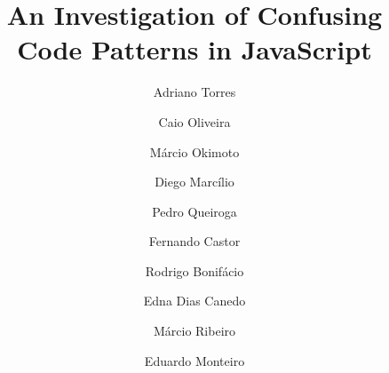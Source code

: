 \documentclass[preprint,12pt]{elsarticle}
\begin{document}
\begin{frontmatter}


\title{An Investigation of Confusing Code Patterns in JavaScript}

\author[1]{Adriano Torres}
\author[1]{Caio Oliveira}
\author[1]{M\'{a}rcio Okimoto}
\author[2]{Diego Marc\'{i}lio} 
\author[3]{Pedro Queiroga}
\author[4,5]{Fernando Castor}
\author[1]{Rodrigo Bonif\'{a}cio}
\author[1]{Edna Dias Canedo}
\author[5]{M\'{a}rcio Ribeiro}
\author[6]{Eduardo Monteiro}

\address[1]{Computer Science Department, University of Bras\'{i}lia, Brazil}
\address[2]{Universit\'{a} Della Svizzera Italiana, Switzerland}
\address[3]{Informatics Center, University Federal of Pernambuco, Brazil}
\address[4]{Information and Computing Sciences Department, Utrecht University, The Netherlands}
\address[5]{Institute of Computing, Federal University of Alagoas, Brazil}
\address[6]{Statistics Department, University of Bras\'{i}lia, Brazil}



\end{frontmatter}




%






{\small
 

}
\end{document}
